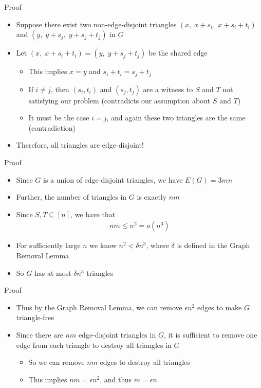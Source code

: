 \begin{frame}{Proof}
\begin{itemize}
	\item Suppose there exist two non-edge-disjoint triangles $(x,\; x+s_i,\; x+s_i+t_i)$ and $(y,\; y+s_j,\; y+s_j + t_j)$ in $G$
	\item Let $(x,\; x+s_i+t_i) = (y,\; y + s_j + t_j)$ be the shared edge
	\begin{itemize}
		\item This implies $x = y$ and $s_i + t_i = s_j + t_j$
		\item If $i \neq j$, then $(s_i, t_i)$ and $(s_j, t_j)$ are a witness to $S$ and $T$ not satisfying our problem (contradicts our assumption about $S$ and $T$)
		\item It must be the case $i = j$, and again these two triangles are the same (contradiction)
	\end{itemize}
	\item Therefore, all triangles are edge-disjoint!
\end{itemize}
\end{frame}

\begin{frame}{Proof}
\begin{itemize}
	\item Since $G$ is a union of edge-disjoint triangles, we have $E(G) = 3mn$
	\item Further, the number of triangles in $G$ is exactly $nm$
	\item Since $S, T \subseteq [n]$, we have that
	\begin{align*}
	nm \leq n^2 = o(n^3)
	\end{align*}
	\item For sufficiently large $n$ we know $n^2 < \delta n^3$, where $\delta$ is defined in the Graph Removal Lemma
	\item So $G$ has at most $\delta n^3$ triangles
\end{itemize}
\end{frame}

\begin{frame}{Proof}
\begin{itemize}
	\item Thus by the Graph Removal Lemma, we can remove $\epsilon n^2$ edges to make $G$ triangle-free
	\item Since there are $nm$ edge-disjoint triangles in $G$, it is sufficient to remove one edge from each triangle to destroy all triangles in $G$
	\begin{itemize}
		\item So we can remove $nm$ edges to destroy all triangles
		\item This implies $nm = \epsilon n^2$, and thus $m = \epsilon n$
	\end{itemize}
\end{itemize}
\end{frame}

